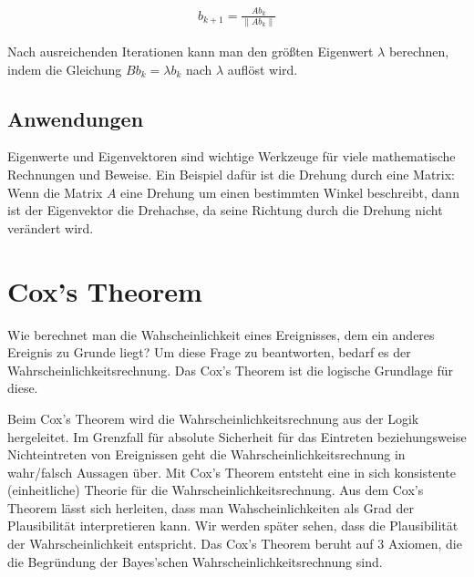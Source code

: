 \documentclass[]{dsadokumentation}
\begin{document}
\begin{equation}
  \begin{aligned}
    b_{k+1} = \frac{Ab_k}{\left\lVert Ab_k \right\rVert }
  \end{aligned}
\end{equation}

Nach ausreichenden Iterationen kann man den größten Eigenwert $\lambda$ berechnen, indem die Gleichung $B b_{k} = \lambda b_{k}$ nach $\lambda$ auflöst wird.


\subsection{Anwendungen}

Eigenwerte und Eigenvektoren sind wichtige Werkzeuge für viele mathematische Rechnungen und Beweise. Ein Beispiel dafür ist die Drehung durch eine Matrix: Wenn die Matrix $A$ eine Drehung um einen bestimmten Winkel beschreibt, dann ist der Eigenvektor die Drehachse, da seine Richtung durch die Drehung nicht verändert wird.

\section{Cox's Theorem}
Wie berechnet man die Wahscheinlichkeit eines Ereignisses, dem ein anderes Ereignis zu Grunde liegt? Um diese Frage zu beantworten, bedarf es der Wahrscheinlichkeitsrechnung. Das Cox's Theorem ist die logische Grundlage für diese.


Beim Cox's Theorem wird die Wahrscheinlichkeitsrechnung aus  der Logik hergeleitet. Im Grenzfall für absolute Sicherheit für das Eintreten beziehungsweise Nichteintreten von Ereignissen geht die Wahrscheinlichkeitsrechnung in wahr/falsch Aussagen über. Mit Cox's Theorem entsteht eine in sich konsistente (einheitliche) Theorie für die Wahrscheinlichkeitsrechnung.
Aus dem Cox's Theorem lässt sich herleiten, dass man Wahscheinlichkeiten als Grad der Plausibilität interpretieren kann. Wir werden später sehen, dass die Plausibilität der Wahrscheinlichkeit entspricht.
Das Cox's Theorem beruht auf 3 Axiomen, die die Begründung der Bayes'schen Wahrscheinlichkeitsrechnung sind.
\end{document}
